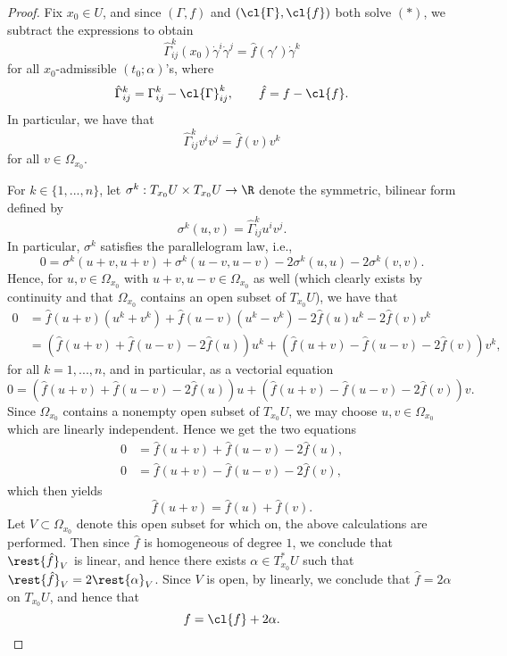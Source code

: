 \begin{proof}
Fix $x_0\in U$, and since $(\Gamma,f)$ and $(\cl{\Gamma},\cl{f})$ both solve $(*)$, we subtract the expressions to obtain
$$\hat{\Gamma}_{ij}^k(x_0)\dot{\gamma}^i\dot{\gamma}^j=\hat{f}(\gamma')\dot{\gamma}^k$$
for all $x_0$-admissible $(t_0;\alpha)$'s, where
$$\hat{\Gamma}_{ij}^k=\Gamma_{ij}^k-\cl{\Gamma}_{ij}^k,\qquad\hat{f}=f-\cl{f}.$$
In particular, we have that
$$\hat{\Gamma}_{ij}^kv^iv^j=\hat{f}(v)v^k$$
for all $v\in\Omega_{x_0}$.

For $k\in\{1,...,n\}$, let $\sigma^k:T_{x_0}U\times T_{x_0}U\to\R$ denote the symmetric, bilinear form defined by
$$\sigma^k(u,v)=\hat{\Gamma}_{ij}^ku^iv^j.$$
In particular, $\sigma^k$ satisfies the parallelogram law, i.e.,
$$0=\sigma^k(u+v,u+v)+\sigma^k(u-v,u-v)-2\sigma^k(u,u)-2\sigma^k(v,v).$$
Hence, for $u,v\in\Omega_{x_0}$ with $u+v,u-v\in\Omega_{x_0}$ as well (which clearly exists by continuity and that $\Omega_{x_0}$ contains an open subset of $T_{x_0}U$), we have that
\begin{align*}
	0&=\hat{f}(u+v)(u^k+v^k)+\hat{f}(u-v)(u^k-v^k)-2\hat{f}(u)u^k-2\hat{f}(v)v^k\\
	&=\left(\hat{f}(u+v)+\hat{f}(u-v)-2\hat{f}(u)\right)u^k+\left(\hat{f}(u+v)-\hat{f}(u-v)-2\hat{f}(v)\right)v^k,
\end{align*}
for all $k=1,...,n$, and in particular, as a vectorial equation
$$0=\left(\hat{f}(u+v)+\hat{f}(u-v)-2\hat{f}(u)\right)u+\left(\hat{f}(u+v)-\hat{f}(u-v)-2\hat{f}(v)\right)v.$$
Since $\Omega_{x_0}$ contains a nonempty open subset of $T_{x_0}U$, we may choose $u,v\in\Omega_{x_0}$ which are linearly independent.  Hence we get the two equations
\begin{equation*}
\begin{aligned}
	0&=\hat{f}(u+v)+\hat{f}(u-v)-2\hat{f}(u),\\
	0&=\hat{f}(u+v)-\hat{f}(u-v)-2\hat{f}(v),
\end{aligned}	
\end{equation*}
which then yields
$$\hat{f}(u+v)=\hat{f}(u)+\hat{f}(v).$$
Let $V\subset\Omega_{x_0}$ denote this open subset for which on, the above calculations are performed.  Then since $\hat{f}$ is homogeneous of degree $1$, we conclude that $\rest{\hat{f}}_V$ is linear, and hence there exists $\alpha\in T_{x_0}^*U$ such that $\rest{\hat{f}}_V=2\rest{\alpha}_V$.  Since $V$ is open, by linearly, we conclude that $\hat{f}=2\alpha$ on $T_{x_0}U$, and hence that
$$f=\cl{f}+2\alpha.$$


\end{proof}
